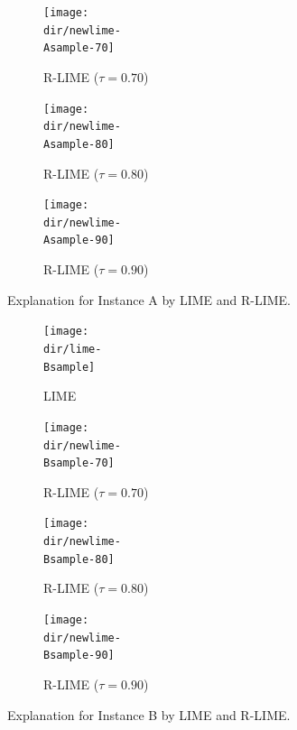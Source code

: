 \documentclass[11pt]{article}
\begin{document}
{{\begin{figure}[p]
\begin{subfigure}[t]{\imgwidth}
					\texttt{[image: \\dir/newlime-\\Asample-70]}
					\caption{R-LIME ($\tau=0.70$)}\label{fig:A-rlime-70}
				\end{subfigure}
				\begin{subfigure}[t]{\imgwidth}
					\texttt{[image: \\dir/newlime-\\Asample-80]}
					\caption{R-LIME ($\tau=0.80$)}\label{fig:A-rlime-80}
				\end{subfigure}
				\begin{subfigure}[t]{\imgwidth}
					\hspace{-0.5em}
					\texttt{[image: \\dir/newlime-\\Asample-90]}
					\caption{R-LIME ($\tau=0.90$)}\label{fig:A-rlime-90}
				\end{subfigure}
				\caption[Explanation for Instance A by LIME and R-LIME]{%
					Explanation for Instance A by LIME and R-LIME.
				}\label{fig:A}
			\end{figure}
			\begin{figure}[p]
				\centering
				\begin{subfigure}[t]{\imgwidth}
					\hspace{-0.7em}
					\texttt{[image: \\dir/lime-\\Bsample]}
					\caption{LIME}\label{fig:B-lime}
				\end{subfigure}
				\begin{subfigure}[t]{\imgwidth}
					\hspace{0.5em}
					\texttt{[image: \\dir/newlime-\\Bsample-70]}
					\caption{R-LIME ($\tau=0.70$)}\label{fig:B-rlime-70}
				\end{subfigure}
				\begin{subfigure}[t]{\imgwidth}
					\hspace{-0.8em}
					\texttt{[image: \\dir/newlime-\\Bsample-80]}
					\caption{R-LIME ($\tau=0.80$)}\label{fig:B-rlime-80}
				\end{subfigure}
				\begin{subfigure}[t]{\imgwidth}
					\hspace{-0.8em}
					\texttt{[image: \\dir/newlime-\\Bsample-90]}
					\caption{R-LIME ($\tau=0.90$)}\label{fig:B-rlime-90}
				\end{subfigure}
				\caption[Explanation for Instance B by LIME and R-LIME]{%
					Explanation for Instance B by LIME and R-LIME.
				}\label{fig:B}
			\end{figure}
		}
	}
\end{document}
